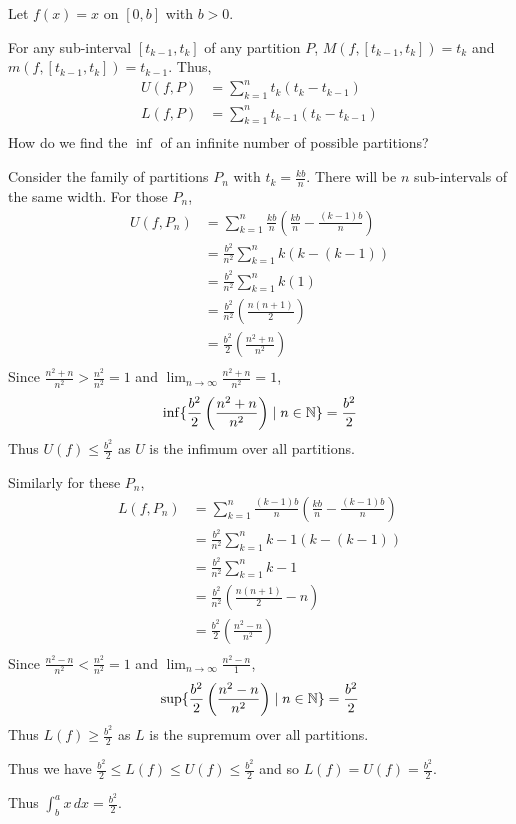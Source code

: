 \documentclass{article}
\begin{document}
\begin{example}
  Let $f(x) = x$ on $[0, b]$ with $b > 0$.

  For any sub-interval $[t_{k-1}, t_k]$ of any partition $P$, $M(f, [t_{k-1}, t_k]) = t_k$ and $m(f, [t_{k-1}, t_k]) = t_{k-1}$. Thus,
  \begin{align*}
    U(f, P) &= \sum_{k=1}^n t_k(t_k - t_{k-1})\\
    L(f, P) &= \sum_{k=1}^n t_{k-1}(t_k - t_{k-1})\\
  \end{align*}
  How do we find the $\inf$ of an infinite number of possible partitions?

  Consider the family of partitions $P_n$ with $t_k = \frac{kb}{n}$. There will be $n$ sub-intervals of the same width. For those $P_n$,
  \begin{align*}
    U(f, P_n) &= \sum_{k=1}^n\frac{kb}{n}\left(\frac{kb}{n} - \frac{(k-1)b}{n}\right)\\
    &= \frac{b^2}{n^2}\sum_{k=1}^n k(k-(k-1))\\
    &= \frac{b^2}{n^2}\sum_{k=1}^n k(1)\\
    &= \frac{b^2}{n^2}\left(\frac{n(n+1)}{2}\right)\\
    &= \frac{b^2}{2} \left(\frac{n^2+n}{n^2}\right)\\
  \end{align*}
  Since $\frac{n^2 + n}{n^2} > \frac{n^2}{n^2} = 1$ and $\lim_{n\to\infty} \frac{n^2 + n}{n^2} = 1$, \[
    \inf \{\frac{b^2}{2}\left(\frac{n^2 + n}{n^2}\right) \mid n \in \mathbb{N}\} = \frac{b^2}{2}
  \]
  Thus $U(f) \leq \frac{b^2}{2}$ as $U$ is the infimum over all partitions.

  Similarly for these $P_n$,
  \begin{align*}
    L(f, P_n) &= \sum_{k=1}^n\frac{(k-1)b}{n}\left(\frac{kb}{n} - \frac{(k-1)b}{n}\right)\\
    &= \frac{b^2}{n^2}\sum_{k=1}^n k - 1(k-(k-1))\\
    &= \frac{b^2}{n^2}\sum_{k=1}^n k-1\\
    &= \frac{b^2}{n^2}\left(\frac{n(n+1)}{2} - n\right)\\
    &= \frac{b^2}{2} \left(\frac{n^2-n}{n^2}\right)\\
  \end{align*}
  Since $\frac{n^2 - n}{n^2} < \frac{n^2}{n^2} = 1$ and $\lim_{n\to\infty} \frac{n^2 - n}{1}$, \[
    \sup \{\frac{b^2}{2}\left(\frac{n^2 - n}{n^2}\right) \mid n \in \mathbb{N}\} = \frac{b^2}{2}
  \]
  Thus $L(f) \geq \frac{b^2}{2}$ as $L$ is the supremum over all partitions.

  Thus we have $\frac{b^2}{2} \leq L(f) \leq U(f) \leq \frac{b^2}{2}$ and so $L(f) = U(f) = \frac{b^2}{2}$.

  Thus $\int_b^a x \, dx = \frac{b^2}{2}$.
\end{example}
\end{document}
